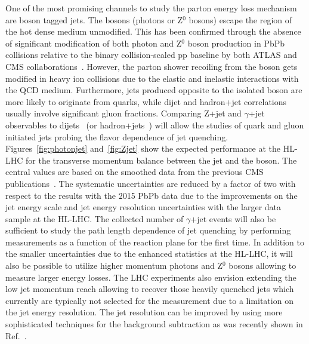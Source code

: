 One of the most promising channels to study the parton energy loss mechanism are boson tagged jets. The bosons (photons or Z$^{0}$ bosons) escape the region of the hot dense medium unmodified. This has been confirmed through the absence of significant modification of both photon and Z$^{0}$ boson production in PbPb collisions relative to the binary collision-scaled pp baseline by both ATLAS and CMS collaborations~\cite{Aad:2012ew,Aad:2015lcb,Chatrchyan:2012vq,Chatrchyan:2014csa}. However, the parton shower recoiling from the boson gets modified in heavy ion collisions due to the elastic and inelastic interactions with the QCD medium. Furthermore, jets produced opposite to the isolated boson
are more likely to originate from quarks, while dijet and hadron+jet correlations usually involve significant gluon fractions. 
Comparing Z+jet and $\gamma$+jet observables to dijets~\cite{Chatrchyan:2011sx,Chatrchyan:2012nia} (or hadron+jets~\cite{Adam:2015doa}) will allow the studies of quark and gluon initiated jets probing the flavor dependence of jet quenching. Figures~\ref{fig:photonjet} and~\ref{fig:Zjet} show the expected performance at the HL-LHC for the transverse momentum balance between the jet and the boson. The central values are based on the smoothed data from the previous CMS publications~\cite{Sirunyan:2017jic,Sirunyan:2017qhf}. The systematic uncertainties are reduced by a factor of two with respect to the results with the 2015 PbPb data due to the improvements on the jet energy scale and jet energy resolution uncertainties with the larger data sample at the HL-LHC. The collected number of $\gamma$+jet events will also be sufficient to study the path length dependence of jet quenching by performing measurements as a function of the reaction plane for the first time. In addition to the smaller uncertainties due to the enhanced statistics at the HL-LHC, it will also be possible to utilize higher momentum photons and Z$^{0}$ bosons allowing to measure larger energy losses. The LHC experiments also envision extending the low jet momentum reach allowing to recover those heavily quenched jets which currently are typically not selected for the measurement due to a limitation on the jet energy resolution. The jet resolution can be improved by using more sophisticated techniques for the background subtraction as was recently shown in Ref.~\cite{Haake:2018hqn}.

